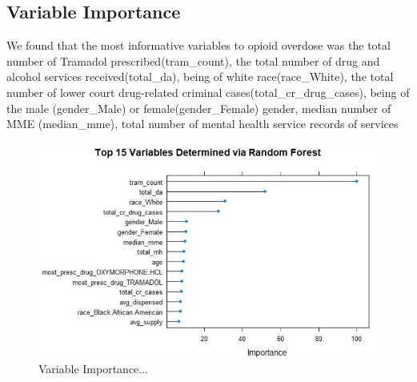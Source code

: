 \documentclass[twoside,10.5pt]{article}
\begin{document}
\subsection{Variable Importance}
We found that the most informative variables to opioid overdose was the total number of Tramadol prescribed(tram\_count), the total number of drug and alcohol services received(total\_da), being of white race(race\_White), the total number of lower court drug-related criminal cases(total\_cr\_drug\_cases), being of the male (gender\_Male) or female(gender\_Female) gender, median number of MME (median\_mme), total number of mental health service records of services

\begin{figure}[h!]
\centering
\includegraphics[width=12cm]{images/variable_importance.JPG}
\caption{Variable Importance... }
\label{fig:var_importance}
\end{figure}
\end{document}
